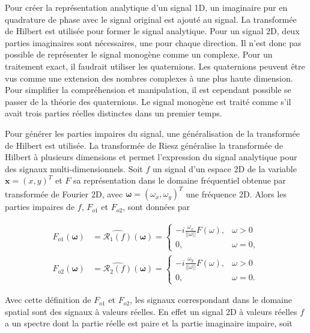 Pour créer la représentation analytique d'un signal 1D, un imaginaire pur en quadrature de phase avec le signal original est ajouté au signal. La transformée de Hilbert est utilisée pour former le signal analytique. Pour un signal 2D, deux parties imaginaires sont nécessaires, une pour chaque direction. Il n'est donc pas possible de représenter le signal monogène comme un complexe. Pour un traitement exact, il faudrait utiliser les quaternions. Les quaternions peuvent être vus comme une extension des nombres complexes à une plus haute dimension. Pour simplifier la compréhension et manipulation, il est cependant possible se passer de la théorie des quaternions. Le signal monogène est traité comme s'il avait trois parties réelles distinctes dans un premier temps.

\bigskip

Pour générer les parties impaires du signal, une généralisation de la transformée de Hilbert est utilisée. La transformée de Riesz généralise la transformée de Hilbert à plusieurs dimensions et permet l'expression du signal analytique pour des signaux multi-dimensionnels. Soit $f$ un signal d'un espace 2D de la variable $\mathbf{x} = (x, y)^T$ et $F$ sa représentation dans le domaine fréquentiel obtenue par transformée de Fourier 2D, avec $\mathbf{\omega}=(\omega_x, \omega_y)^T$ une fréquence 2D. Alors les parties impaires de $f$, $F_{o1}$ et $F_{o2}$, sont données par

\begin{align}
    F_{o1}(\mathbf{\omega}) &= \widehat{\mathcal{R}_1(f)}(\mathbf{\omega}) =
        \left\{
        \begin{array}{ll}
            -i\frac{\omega_x}{||\omega||}F(\omega), & \omega > 0 \\
            0, & \omega = 0,
        \end{array}
        \right. \\
    F_{o2}(\mathbf{\omega}) &= \widehat{\mathcal{R}_2(f)}(\mathbf{\omega}) =
        \left\{
        \begin{array}{ll}
            -i\frac{\omega_y}{||\omega||}F(\omega), & \omega > 0 \\
            0, & \omega = 0.
        \end{array}
        \right.
    \label{eq:2.20}
\end{align}

\noindent Avec cette définition de $F_{o1}$ et $F_{o2}$, les signaux correspondant dans le domaine spatial sont des signaux à valeurs réelles. En effet un signal 2D à valeurs réelles $f$ a un spectre dont la partie réelle est paire et la partie imaginaire impaire, soit


